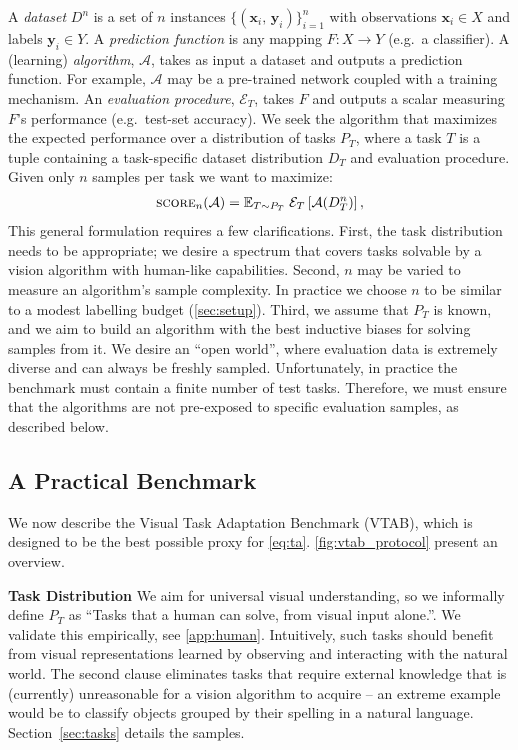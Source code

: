 \documentclass{article}
\def\vx{{\bm{x}}}
\def\vy{{\bm{y}}}
\newcommand{\myparagraph}[1]{\noindent\textbf{#1}\quad}
\def\t{T}
\newcommand{\dataspace}{X}
\newcommand{\labelspace}{Y}
\begin{document}
A \emph{dataset} $D^n$ is a set of $n$ instances $\{(\vx_i,\, \vy_i)\}_{i=1}^n$ with observations  $\vx_i \in \dataspace$ and labels $\vy_i \in \labelspace$.
A \emph{prediction function} is any mapping $F: X \to Y$ (e.g.\ a classifier).
A (learning) \emph{algorithm}, $\mathcal{A}$, takes as input a dataset and outputs a prediction function.
For example, $\mathcal{A}$ may be a pre-trained network coupled with a training mechanism.
An \emph{evaluation procedure}, $\mathcal{E}_T$, takes $F$ and outputs a scalar measuring $F$'s performance (e.g.\ test-set accuracy). 
We seek the algorithm that maximizes the expected performance over a distribution of tasks $P_\t$, where a task $\t$ is a tuple containing a task-specific dataset distribution $D_\t$ and evaluation procedure.
Given only $n$ samples per task we want to maximize:
\begin{align}
\textsc{score}_n(\mathcal{A}) = \mathbb{E}_{\t \sim P_\t}\; \mathcal{E}_\t\left[ \mathcal{A}(D_\t^n) \right],\label{eq:ta}
\end{align}
This general formulation requires a few clarifications.
First, the task distribution needs to be appropriate; we desire a spectrum that covers tasks solvable by a vision algorithm with human-like capabilities.
Second, $n$ may be varied to measure an algorithm's sample complexity.
In practice we choose $n$ to be similar to a modest labelling budget (\cref{sec:setup}).
Third, we assume that $P_\t$ is known, and we aim to build an algorithm with the best inductive biases for solving samples from it.
We desire an ``open world'', where evaluation data is extremely diverse and can always be freshly sampled.
Unfortunately, in practice the benchmark must contain a finite number of test tasks. Therefore, we must ensure that the algorithms are not pre-exposed to specific evaluation samples, as described below.


\subsection{A Practical Benchmark}
We now describe the Visual Task Adaptation Benchmark (VTAB), which is designed to be the best possible proxy for \cref{eq:ta}.
\cref{fig:vtab_protocol} present an overview.

\myparagraph{Task Distribution}
We aim for universal visual understanding, so we informally define $P_\t$ as ``Tasks that a human can solve, from visual input alone.''. 
We validate this empirically, see \cref{app:human}.
Intuitively, such tasks should benefit from visual representations learned by observing and interacting with the natural world. 
The second clause eliminates tasks that require external knowledge that is (currently) unreasonable for a vision algorithm to acquire -- an extreme example would be to classify objects grouped by their spelling in a natural language.
Section~\ref{sec:tasks} details the samples.
\end{document}
